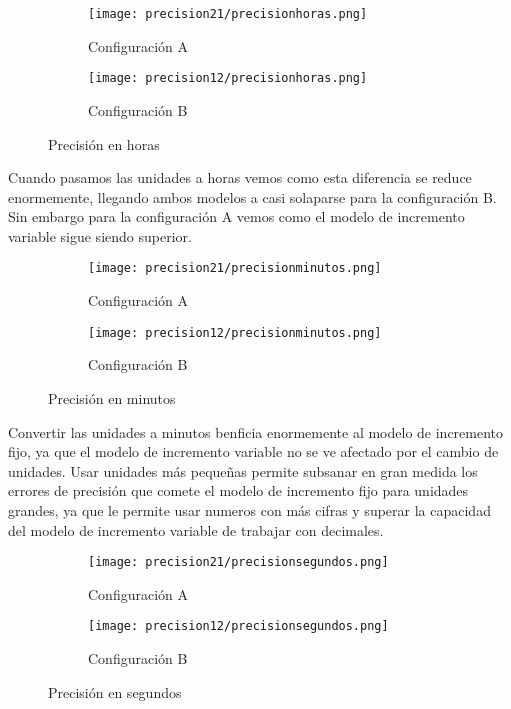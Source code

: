 \begin{figure}[H]
	\centering
	\begin{subfigure}[b]{0.8\textwidth}
		\centering
		\texttt{[image: precision21/precisionhoras.png]}
		\caption{Configuración A}
	\end{subfigure}
	\hfill
	\begin{subfigure}[b]{0.8\textwidth}
		\centering
		\texttt{[image: precision12/precisionhoras.png]}
		\caption{Configuración B}
	\end{subfigure}
	\caption{Precisión en horas}
\end{figure}

Cuando pasamos las unidades a horas vemos como esta diferencia se reduce enormemente, llegando ambos modelos a casi solaparse para la configuración B. Sin embargo para la configuración A vemos como el modelo de incremento variable sigue siendo superior.

\begin{figure}[H]
	\centering
	\begin{subfigure}[b]{0.8\textwidth}
		\centering
		\texttt{[image: precision21/precisionminutos.png]}
		\caption{Configuración A}
	\end{subfigure}
	\hfill
	\begin{subfigure}[b]{0.8\textwidth}
		\centering
		\texttt{[image: precision12/precisionminutos.png]}
		\caption{Configuración B}
	\end{subfigure}
	\caption{Precisión en minutos}
\end{figure}

Convertir las unidades a minutos benficia enormemente al modelo de incremento fijo, ya que el modelo de incremento variable no se ve afectado por el cambio de unidades. Usar unidades más pequeñas permite subsanar en gran medida los errores de precisión que comete el modelo de incremento fijo para unidades grandes, ya que le permite usar numeros con más cifras y superar la capacidad del modelo de incremento variable de trabajar con decimales.

\begin{figure}[H]
	\centering
	\begin{subfigure}[b]{0.8\textwidth}
		\centering
		\texttt{[image: precision21/precisionsegundos.png]}
		\caption{Configuración A}
	\end{subfigure}
	\hfill
	\begin{subfigure}[b]{0.8\textwidth}
		\centering
		\texttt{[image: precision12/precisionsegundos.png]}
		\caption{Configuración B}
	\end{subfigure}
	\caption{Precisión en segundos}
\end{figure}


